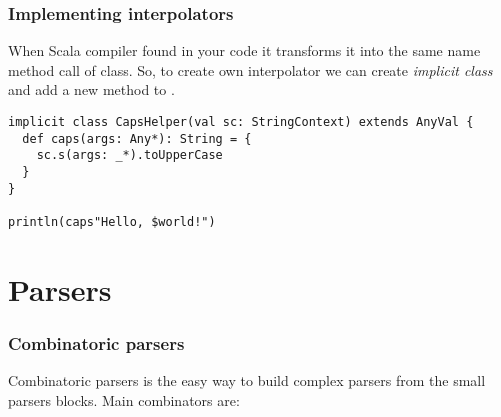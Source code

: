 \documentclass[t]{beamer}
\begin{document}
\begin{frame}[fragile]
\frametitle{Implementing interpolators}

When Scala compiler found  in your code it transforms it into the same name method call
of  class.  So, to create own interpolator we can create \emph{implicit class} and add
a new method to .

\begin{lstlisting}
implicit class CapsHelper(val sc: StringContext) extends AnyVal {
  def caps(args: Any*): String = {
    sc.s(args: _*).toUpperCase
  }
}

println(caps"Hello, $world!")
\end{lstlisting}

\end{frame}

\section{Parsers}

\begin{frame}[fragile]
\frametitle{Combinatoric parsers}
Combinatoric parsers is the easy way to build complex parsers from the small parsers blocks.
Main combinators are:
\end{frame}
\end{document}
